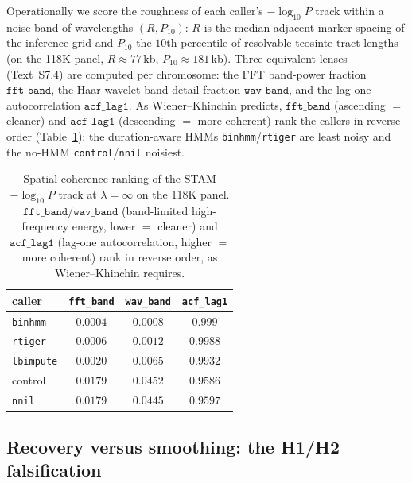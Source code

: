 \documentclass[11pt]{article}
\providecommand{\nnil}{\texttt{nnil}\xspace}
\providecommand{\rtiger}{\texttt{rtiger}\xspace}
\providecommand{\binhmm}{\texttt{binhmm}\xspace}
\providecommand{\lbimpute}{\texttt{lbimpute}\xspace}
\begin{document}
Operationally we score the roughness of each caller's $-\log_{10}P$ track within a
noise band of wavelengths $(R,P_{10})$: $R$ is the median adjacent-marker spacing of
the inference grid and $P_{10}$ the $10$th percentile of resolvable teosinte-tract
lengths (on the 118K panel, $R\approx77$\,kb, $P_{10}\approx181$\,kb). Three
equivalent lenses (Text~S7.4) are computed per chromosome: the FFT band-power
fraction $\texttt{fft\_band}$, the Haar wavelet band-detail fraction
$\texttt{wav\_band}$, and the lag-one autocorrelation $\texttt{acf\_lag1}$. As
Wiener--Khinchin predicts, $\texttt{fft\_band}$ (ascending $=$ cleaner) and
$\texttt{acf\_lag1}$ (descending $=$ more coherent) rank the callers in reverse order
(Table~\ref{tab:noisiness}): the duration-aware HMMs \binhmm/\rtiger
are least noisy and the no-HMM \texttt{control}/\nnil noisiest.
\begin{table}[t]
\centering
\begin{tabular}{l c c c}
\toprule
caller & \texttt{fft\_band} & \texttt{wav\_band} & \texttt{acf\_lag1} \\
\midrule
\binhmm   & $0.0004$ & $0.0008$ & $0.999$  \\
\rtiger   & $0.0006$ & $0.0012$ & $0.9988$ \\
\lbimpute & $0.0020$ & $0.0065$ & $0.9932$ \\
control  & $0.0179$ & $0.0452$ & $0.9586$ \\
\nnil     & $0.0179$ & $0.0445$ & $0.9597$ \\
\bottomrule
\end{tabular}
\caption{Spatial-coherence ranking of the STAM $-\log_{10}P$ track at
$\lambda=\infty$ on the 118K panel. $\texttt{fft\_band}$/$\texttt{wav\_band}$
(band-limited high-frequency energy, lower $=$ cleaner) and $\texttt{acf\_lag1}$
(lag-one autocorrelation, higher $=$ more coherent) rank in reverse order, as
Wiener--Khinchin requires.}
\label{tab:noisiness}
\end{table}

\subsection{Recovery versus smoothing: the H1/H2 falsification}
\label{sec:h1h2}
\end{document}
